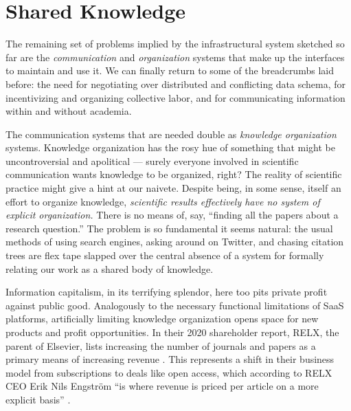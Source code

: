 \hypertarget{shared-knowledge}{%
\section{Shared Knowledge}\label{shared-knowledge}}

The remaining set of problems implied by the infrastructural system
sketched so far are the \emph{communication} and \emph{organization}
systems that make up the interfaces to maintain and use it. We can
finally return to some of the breadcrumbs laid before: the need for
negotiating over distributed and conflicting data schema, for
incentivizing and organizing collective labor, and for communicating
information within and without academia.

The communication systems that are needed double as \emph{knowledge
organization} systems. Knowledge organization has the rosy hue of
something that might be uncontroversial and apolitical --- surely
everyone involved in scientific communication wants knowledge to be
organized, right? The reality of scientific practice might give a hint
at our naivete. Despite being, in some sense, itself an effort to
organize knowledge, \emph{scientific results effectively have no system
of explicit organization.} There is no means of, say, ``finding all the
papers about a research question.'' The problem is so fundamental
it seems natural: the usual methods of using search engines, asking
around on Twitter, and chasing citation trees are flex tape slapped over
the central absence of a system for formally relating our work as a
shared body of knowledge.

Information capitalism, in its terrifying splendor, here too pits
private profit against public good. Analogously to the necessary
functional limitations of SaaS platforms, artificially limiting
knowledge organization opens space for new products and profit
opportunities. In their 2020 shareholder report, RELX, the parent of
Elsevier, lists increasing the number of journals and papers as a
primary means of increasing revenue \citep{RELXAnnualReport2020} .
This represents a shift in their business model from subscriptions to
deals like open access, which according to RELX CEO Erik Nils Engström
``is where revenue is priced per article on a more explicit basis'' \citep{relx2020ResultsPresentation2021} .

